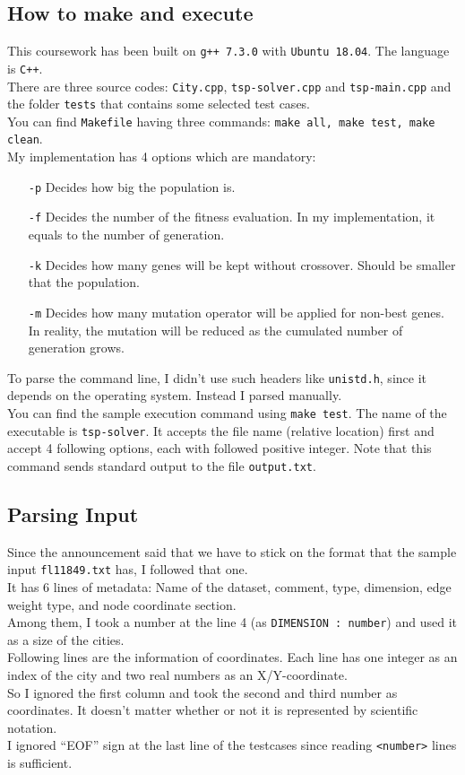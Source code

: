 \documentclass[11pt]{article}
\begin{document}
\subsection{How to make and execute} \label{ssec:1.1}
This coursework has been built on \texttt{g++ 7.3.0} with \texttt{Ubuntu 18.04}. The language is \texttt{C++}. \\
There are three source codes: \texttt{City.cpp}, \texttt{tsp-solver.cpp} and \texttt{tsp-main.cpp} and the folder \texttt{tests} that contains some selected test cases. \\
You can find \texttt{Makefile} having three commands: \texttt{make all, make test, make clean}. \\
My implementation has 4 options which are mandatory:
\begin{itemize}
	\item[\texttt{-p}] Decides how big the population is.
	\item[\texttt{-f}] Decides the number of the fitness evaluation. In my implementation, it equals to the number of generation.
	\item[\texttt{-k}] Decides how many genes will be kept without crossover. Should be smaller that the population.
	\item[\texttt{-m}] Decides how many mutation operator will be applied for non-best genes. In reality, the mutation will be reduced as the cumulated number of generation grows.
\end{itemize}
To parse the command line, I didn't use such headers like \texttt{unistd.h}, since it depends on the operating system. Instead I parsed manually. \\
You can find the sample execution command using \texttt{make test}. The name of the executable is \texttt{tsp-solver}. It accepts the file name (relative location) first and accept 4 following options, each with followed positive integer. Note that this command sends standard output to the file \texttt{output.txt}. 

\subsection{Parsing Input} \label{ssec:1.2}
Since the announcement said that we have to stick on the format that the sample input \texttt{fl11849.txt} has, I followed that one. \\
It has 6 lines of metadata: Name of the dataset, comment, type, dimension, edge weight type, and node coordinate section. \\
Among them, I took a number at the line 4 (as \texttt{DIMENSION : number}) and used it as a size of the cities. \\
Following lines are the information of coordinates. Each line has one integer as an index of the city and two real numbers as an X/Y-coordinate. \\
So I ignored the first column and took the second and third number as coordinates. It doesn't matter whether or not it is represented by scientific notation. \\
I ignored ``EOF'' sign at the last line of the testcases since reading \texttt{<number>} lines is sufficient.
\end{document}
